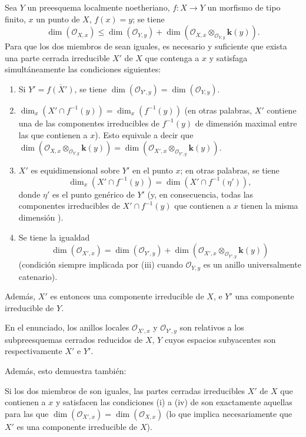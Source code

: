 \begin{proposition}[13.2.7]
\label{IV.13.2.7}
Sea $Y$ un preesquema localmente noetheriano, $f:X\to Y$ un morfismo de tipo finito, $x$ un punto de $X$, $f(x)=y$; se tiene
\[
\tag{13.2.7.1}
\label{IV.13.2.7.1-fr}
  \dim(\mathcal O_{X,x})\leq\dim(\mathcal O_{Y,y})
  +\dim(\mathcal O_{X,x}\otimes_{\mathcal O_{Y,y}}\boldsymbol{k}(y)).
\]
Para que los dos miembros de  sean iguales, es necesario y suficiente que exista una parte cerrada irreducible $X'$ de $X$ que contenga a $x$ y satisfaga simultáneamente las condiciones siguientes:
\begin{enumerate}[label=\textup{(\roman*)}]
  \item Si $Y'=\overline{f(X')}$, se tiene $\dim(\mathcal O_{Y',y})=\dim(\mathcal O_{Y,y})$.
  \item $\dim_x(X'\cap f^{-1}(y))=\dim_x(f^{-1}(y))$ (en otras palabras, $X'$ contiene una de las componentes irreducibles de $f^{-1}(y)$ de dimensión maximal entre las que contienen a $x$). Esto equivale a decir que $\dim(\mathcal O_{X,x}\otimes_{\mathcal O_{Y,y}}\boldsymbol{k}(y))
  =\dim(\mathcal O_{X',x}\otimes_{\mathcal O_{Y',y}}\boldsymbol{k}(y))$.
  \item $X'$ es equidimensional sobre $Y'$ en el punto $x$; en otras palabras, se tiene
  \[
    \dim_x(X'\cap f^{-1}(y))=\dim(X'\cap f^{-1}(\eta')),
  \]
  donde $\eta'$ es el punto genérico de $Y'$ (y, en consecuencia, todas las componentes irreducibles de $X'\cap f^{-1}(y)$ que contienen a $x$ tienen la misma dimensión ).
  \item Se tiene la igualdad
  \[
    \dim(\mathcal O_{X',x})=\dim(\mathcal O_{Y',y})
    +\dim(\mathcal O_{X',x}\otimes_{\mathcal O_{Y',y}}\boldsymbol{k}(y))
  \]
  (condición siempre implicada por \textup{(iii)} cuando $\mathcal O_{Y,y}$ es un anillo universalmente catenario).
\end{enumerate}
Además, $X'$ es entonces una componente irreducible de $X$, e $Y'$ una componente irreducible de $Y$.
\end{proposition}

En el enunciado, los anillos locales $\mathcal O_{X',x}$ y $\mathcal O_{Y',y}$ son relativos a los subpreesquemas cerrados reducidos de $X$, $Y$ cuyos espacios subyacentes son respectivamente $X'$ e $Y'$.

Además, esto demuestra también:

\begin{corollary}[13.2.8]
\label{IV.13.2.8}
Si los dos miembros de  son iguales, las partes cerradas irreducibles $X'$ de $X$ que contienen a $x$ y satisfacen las condiciones \textup{(i)} a \textup{(iv)} de  son exactamente aquellas para las que $\dim(\mathcal O_{X',x})=\dim(\mathcal O_{X,x})$ (lo que implica necesariamente que $X'$ es una componente irreducible de $X$).
\end{corollary}

